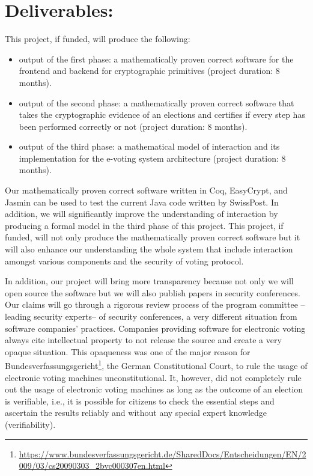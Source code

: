 \documentclass[a4paper]{article}
\begin{document}
  
\section{Deliverables:} 

This project, if funded, will produce the following:
\begin{itemize}
  \item output of the first phase: a mathematically proven correct software for the frontend and backend 
    for cryptographic primitives (project duration: 8 months). 
  \item output of the second phase: a mathematically proven correct software that takes the cryptographic evidence of an elections
    and certifies if every step has been performed correctly or not (project duration: 8 months). 
  \item output of the third phase: a mathematical model of interaction and its implementation 
    for the e-voting system architecture (project duration: 8 months).
  
\end{itemize}

Our mathematically proven correct software written in Coq, EasyCrypt, and Jasmin 
can be used to test the current Java code written by SwissPost. In addition, we 
will significantly improve the understanding of interaction by producing a formal model 
in the third phase of this project. This project, if funded, will 
not only produce the mathematically proven correct software but it will also 
enhance our understanding the whole system that include interaction amongst 
various components and the security of voting protocol. 

In addition, our project will bring more transparency because not only we will 
open source the software but we will also publish papers in security conferences. 
Our claims will go through a rigorous review process of the program committee --leading 
security experts-- of security conferences, 
a very different situation from software companies' practices. Companies providing software for 
electronic voting always cite intellectual property to not release the 
source and create a very opaque situation. This opaqueness was one of the major reason for
Bundesverfassungsgericht\footnote{\url{https://www.bundesverfassungsgericht.de/SharedDocs/Entscheidungen/EN/2009/03/cs20090303_2bvc000307en.html}}, 
the German Constitutional Court, to rule the usage of electronic voting
machines unconstitutional. It, however, did not completely rule out the usage of electronic voting
machines as long as the outcome of an election is verifiable, i.e., it is possible for citizens to check
the essential steps and ascertain the results reliably and without
any special expert knowledge (verifiability).





\end{document}
